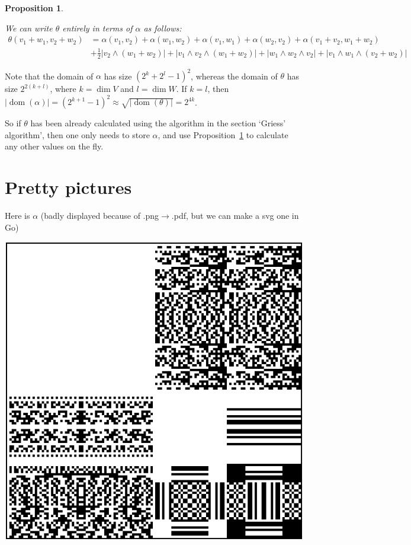 \documentclass[a4paper,debug]{tufte-handout}
\theoremstyle{plain}
\newtheorem{proposition}[theorem]{Proposition}
\theoremstyle{definition}
\theoremstyle{remark}
\DeclareMathOperator{\dom}{dom}
\begin{document}
\begin{proposition}\label{eq:reconstructing theta}

We can write $\theta$ entirely in terms of $\alpha$ as follows:
\begin{align*}
	\theta(v_1+w_1,v_2+w_2)	& = \alpha(v_1,v_2)  + \alpha(w_1,w_2) + \alpha(v_1,w_1) + \alpha(w_2,v_2) + \alpha(v_1+v_2,w_1+w_2)\\
							& + \frac12|v_2\wedge(w_1+w_2)| + |v_1\wedge v_2 \wedge (w_1+w_2)| + |w_1\wedge w_2 \wedge v_2| + |v_1\wedge w_1 \wedge (v_2 + w_2)| 
\end{align*}
\end{proposition}

Note that the domain of $\alpha$ has size $(2^k + 2^l - 1)^2$, whereas the domain of $\theta$ has size $2^{2(k+l)}$, where $k=\dim V$ and $l=\dim W$.
If $k=l$, then $|\dom(\alpha)| = (2^{k+1}-1)^2 \approx \sqrt{|\dom(\theta)|} = 2^{4k}$.

So if $\theta$ has been already calculated using the algorithm in the section `Griess' algorithm', then one only needs to store $\alpha$, and use Proposition~\ref{eq:reconstructing theta} to calculate any other values on the fly.

\section{Pretty pictures}

Here is $\alpha$ (badly displayed because of .png$\to$.pdf, but we can make a svg one in Go)

\begin{center}
	\includegraphics[width=\textwidth]{alpha555_no_label.png}
\end{center}



\end{document}

